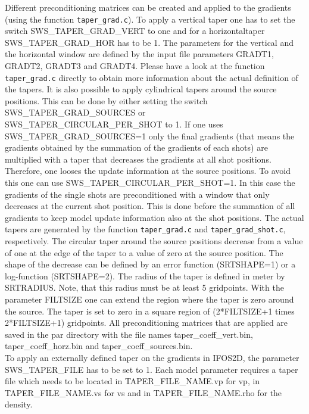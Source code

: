 Different preconditioning matrices can be created and applied to the gradients (using the function \texttt{taper\_grad.c}). To apply a vertical taper one has to set the switch SWS\_TAPER\_GRAD\_VERT to one and for a horizontaltaper SWS\_TAPER\_GRAD\_HOR has to be 1. The parameters for the vertical and the horizontal window are defined by the input file parameters GRADT1, GRADT2, GRADT3 and GRADT4. Please have a look at the function \texttt{taper\_grad.c} directly to obtain more information about the actual definition of the tapers. It is also possible to apply cylindrical tapers around the source positions. This can be done by either setting the switch SWS\_TAPER\_GRAD\_SOURCES or SWS\_TAPER\_CIRCULAR\_PER\_SHOT to 1. If one uses SWS\_TAPER\_GRAD\_SOURCES=1 only the final gradients (that means the gradients obtained by the summation of the gradients of each shots) are multiplied with a taper that decreases the gradients at all shot positions. Therefore, one looses the update information at the source positions. To avoid this one can use SWS\_TAPER\_CIRCULAR\_PER\_SHOT=1. In this case the gradients of the single shots are preconditioned with a window that only decreases at the current shot position. This is done before the summation of all gradients to keep model update information also at the shot positions. The actual tapers are generated by the function \texttt{taper\_grad.c} and \texttt{taper\_grad\_shot.c}, respectively. The circular taper around the source positions decrease from a value of one at the edge of the taper to a value of zero at the source position. The shape of the decrease can be defined by an error function (SRTSHAPE=1) or a log-function (SRTSHAPE=2). The radius of the taper is defined in meter by SRTRADIUS. Note, that this radius must be at least 5 gridpoints. With the parameter FILTSIZE one can extend the region where the taper is zero around the source. The taper is set to zero in a square region of (2*FILTSIZE+1 times 2*FILTSIZE+1) gridpoints. All preconditioning matrices that are applied are saved in the par directory with the file names taper\_coeff\_vert.bin, taper\_coeff\_horz.bin and taper\_coeff\_sources.bin.\\

To apply an externally defined taper on the gradients in IFOS2D, the parameter SWS\_TAPER\_FILE has to be set to 1. Each model parameter requires a taper file which needs to be located in TAPER\_FILE\_NAME.vp for vp, in TAPER\_FILE\_NAME.vs for vs and in TAPER\_FILE\_NAME.rho for the density.\\

